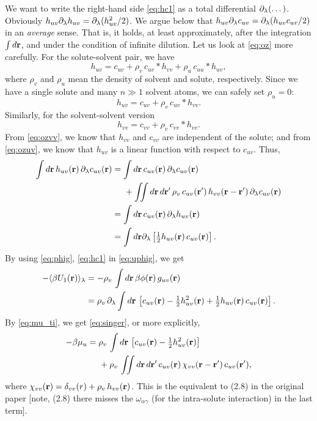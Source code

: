 \documentclass[12pt]{article}
\begin{document}
We want to write the right-hand side \eqref{eq:hc1} as
a total differential $\partial_\lambda(\dots)$.
%
Obviously $h_{uv} \partial_\lambda h_{uv} = \partial_\lambda ( h_{uv}^2/2 )$.
%
We argue below that $h_{uv} \partial_\lambda c_{uv} = \partial_\lambda ( h_{uv} c_{uv} /2) $
in an \emph{average} sense.
%
That is, it holds, at least approximately,
after the integration $\int d\mathbf{r}$,
and under the condition of infinite dilution.
Let us look at \eqref{eq:oz} more carefully.
%
For the solute-solvent pair, we have
\[
  h_{uv} = c_{uv} + \rho_v \, c_{uv}*h_{vv}
  + \rho_u \, c_{uu}*h_{uv},
\]
where $\rho_v$ and $\rho_u$ mean the density of
solvent and solute, respectively.
%
Since we have a single solute and many $n \gg 1$ solvent atoms,
we can safely set $\rho_u = 0$:
\begin{equation}
  h_{uv} = c_{uv} + \rho_v \, c_{uv}*h_{vv}.
  \label{eq:ozuv}
\end{equation}
%
Similarly, for the solvent-solvent version
\begin{equation}
  h_{vv} = c_{vv} + \rho_v \, c_{vv}*h_{vv}.
  \label{eq:ozvv}
\end{equation}
From \eqref{eq:ozvv}, we know that
  $h_{vv}$ and $c_{vv}$ are independent of the solute;
and from \eqref{eq:ozuv}, we know that
  $h_{uv}$ is a linear function with respect to $c_{uv}$.
%
Thus,
\begin{align}
  \int d\mathbf{r} \, h_{uv}(\mathbf{r}) \, \partial_\lambda c_{uv}(\mathbf{r})
  &=
  \int d\mathbf{r} \,
  c_{uv}(\mathbf{r}) \, \partial_\lambda c_{uv}(\mathbf{r}) \notag \\
  & \;\;\;\;\;
    +
    \iint d\mathbf{r} \, d\mathbf{r}'
    \, \rho_v
    \, c_{uv}(\mathbf{r}')
    \, h_{vv}(\mathbf{r} - \mathbf{r}')
    \, \partial_\lambda c_{uv}(\mathbf{r}) \notag \\
  &= \int d\mathbf{r} \, c_{uv}(\mathbf{r}) \, \partial_\lambda h_{uv}(\mathbf{r}) \notag \\
  &= \int d\mathbf{r} \partial_\lambda
    \left[
      \tfrac{1}{2} h_{uv}(\mathbf{r}) \,  c_{uv}(\mathbf{r})
    \right].
  \label{eq:phig}
\end{align}
%
By using \eqref{eq:phig}, \eqref{eq:hc1} in \eqref{eq:uphig}, we get
%
\begin{align}
  - \langle
  \beta U_1(\mathbf{r})
  \rangle_\lambda
  &=
  - \rho_v \,
  \int d \mathbf{r}
  \, \beta \phi(\mathbf{r}) \, g_{uv}(\mathbf{r}) \notag \\
  &=
   \rho_v \, \partial_\lambda \int d \mathbf{r} \,
   \left[
    c_{uv}(\mathbf{r})
    - \tfrac{1}{2} h_{uv}^2(\mathbf{r})
    + \tfrac{1}{2} h_{uv}(\mathbf{r}) \, c_{uv}(\mathbf{r})
    \right].
\end{align}
%
%
%
By \eqref{eq:mu_ti}, we get \eqref{eq:singer}, or more explicitly,
\begin{align}
  -\beta \mu_u
  &=
   \rho_v \, \int
    d \mathbf{r} \,
   \left[
     c_{uv}(\mathbf{r})
    - \tfrac{1}{2} h_{uv}^2(\mathbf{r})
    \right]
  \notag \\
  & \;\;\;\;\;
    +
    \rho_v \, \iint d\mathbf{r} \, d\mathbf{r}'
    \, c_{uv}(\mathbf{r})
    \, \chi_{vv}(\mathbf{r} - \mathbf{r}')
    \, c_{uv}(\mathbf{r}'),
 \label{eq:muexpanded}
\end{align}
where
$\chi_{vv}(\mathbf{r}) = \delta_{vv}(r) + \rho_v \, h_{vv}(\mathbf{r})$.
%
This is the equivalent to (2.8) in the original paper \cite{singer}
[note,
(2.8) there misses the $\omega_{\alpha\gamma}$
(for the intra-solute interaction)
in the last term].
\end{document}

